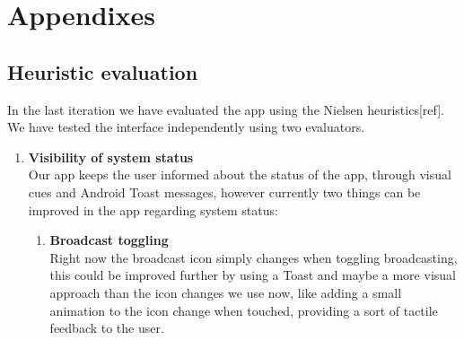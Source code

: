 \documentclass[runningheads,a4paper]{llncs}
\begin{document}
\section*{Appendixes}

\subsection*{Heuristic evaluation}
In the last iteration we have evaluated the app using the Nielsen heuristics[ref].
We have tested the interface independently using two evaluators.\\


\begin{enumerate}
  \item \textbf{Visibility of system status}\\
  Our app keeps the user informed about the status of the app, through visual cues and Android Toast messages, however currently two things can be improved in the app regarding system status:
  \begin{enumerate}
    \item \textbf{Broadcast toggling}\\
    Right now the broadcast icon simply changes when toggling broadcasting, this could be improved further by using a Toast and maybe a more visual approach than the icon changes we use now, like adding a small animation to the icon change when touched, providing a sort of tactile feedback to the user.
    

\end{enumerate}
\end{enumerate}
\end{document}
